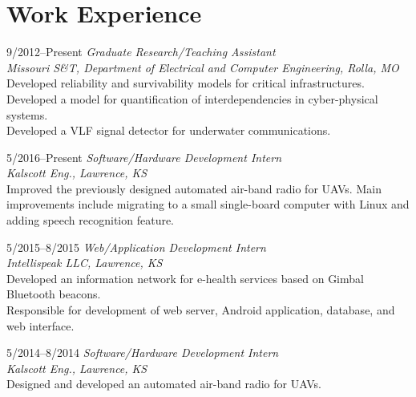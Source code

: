 \documentclass[10pt]{article}
\newlength{\Vspace}
\newlength{\Vspace}
\begin{document}
\section{Work Experience}

\begin{CV}

\item[9/2012--Present] \textit{Graduate Research/Teaching Assistant} \\
    \textit{Missouri S\&T, Department of Electrical and Computer Engineering, Rolla, MO}\vspace{\Vspace} \\
    Developed reliability and survivability models for critical infrastructures. \\
    Developed a model for quantification of interdependencies in cyber-physical systems. \\
    Developed a VLF signal detector for underwater communications.

\item[5/2016--Present] \textit{Software/Hardware Development Intern} \\
    \textit{Kalscott Eng., Lawrence, KS}\vspace{\Vspace} \\
    Improved the previously designed automated air-band radio for UAVs. Main improvements include migrating to a small single-board computer with Linux and adding speech recognition feature.

\item[5/2015--8/2015] \textit{Web/Application Development Intern} \\
    \textit{Intellispeak LLC, Lawrence, KS}\vspace{\Vspace} \\
    Developed an information network for e-health services based on Gimbal Bluetooth beacons. \\
    Responsible for development of web server, Android application, database, and web interface.

\item[5/2014--8/2014] \textit{Software/Hardware Development Intern} \\
    \textit{Kalscott Eng., Lawrence, KS}\vspace{\Vspace} \\
    Designed and developed an automated air-band radio for UAVs.


\end{CV}
\end{document}
